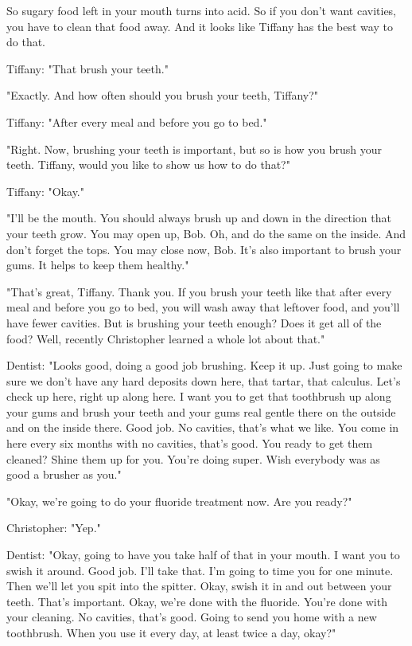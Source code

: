 So sugary food left in your mouth turns into acid. So if you don't want cavities, you have to clean that food away. And it looks like Tiffany has the best way to do that.

Tiffany: "That brush your teeth."

"Exactly. And how often should you brush your teeth, Tiffany?"

Tiffany: "After every meal and before you go to bed."

"Right. Now, brushing your teeth is important, but so is how you brush your teeth. Tiffany, would you like to show us how to do that?"

Tiffany: "Okay."

"I'll be the mouth. You should always brush up and down in the direction that your teeth grow. You may open up, Bob. Oh, and do the same on the inside. And don't forget the tops. You may close now, Bob. It's also important to brush your gums. It helps to keep them healthy."

"That's great, Tiffany. Thank you. If you brush your teeth like that after every meal and before you go to bed, you will wash away that leftover food, and you'll have fewer cavities. But is brushing your teeth enough? Does it get all of the food? Well, recently Christopher learned a whole lot about that."

Dentist: "Looks good, doing a good job brushing. Keep it up. Just going to make sure we don't have any hard deposits down here, that tartar, that calculus. Let's check up here, right up along here. I want you to get that toothbrush up along your gums and brush your teeth and your gums real gentle there on the outside and on the inside there. Good job. No cavities, that's what we like. You come in here every six months with no cavities, that's good. You ready to get them cleaned? Shine them up for you. You're doing super. Wish everybody was as good a brusher as you."

"Okay, we're going to do your fluoride treatment now. Are you ready?"

Christopher: "Yep."

Dentist: "Okay, going to have you take half of that in your mouth. I want you to swish it around. Good job. I'll take that. I'm going to time you for one minute. Then we'll let you spit into the spitter. Okay, swish it in and out between your teeth. That's important. Okay, we're done with the fluoride. You're done with your cleaning. No cavities, that's good. Going to send you home with a new toothbrush. When you use it every day, at least twice a day, okay?"

